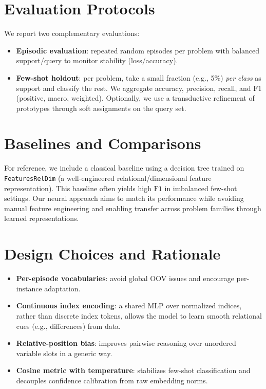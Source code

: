 \documentclass[11pt]{article}
\begin{document}
\section{Evaluation Protocols}
We report two complementary evaluations:
\begin{itemize}[noitemsep]
  \item \textbf{Episodic evaluation}: repeated random episodes per problem with balanced support/query to monitor stability (loss/accuracy).
  \item \textbf{Few-shot holdout}: per problem, take a small fraction (e.g., 5\%) \emph{per class} as support and classify the rest. We aggregate accuracy, precision, recall, and $\mathrm{F1}$ (positive, macro, weighted). Optionally, we use a transductive refinement of prototypes through soft assignments on the query set.
\end{itemize}

\section{Baselines and Comparisons}
For reference, we include a classical baseline using a decision tree trained on \texttt{FeaturesRelDim} (a well-engineered relational/dimensional feature representation). This baseline often yields high $\mathrm{F1}$ in imbalanced few-shot settings. Our neural approach aims to match its performance while avoiding manual feature engineering and enabling transfer across problem families through learned representations.

\section{Design Choices and Rationale}
\begin{itemize}[noitemsep]
  \item \textbf{Per-episode vocabularies}: avoid global OOV issues and encourage per-instance adaptation.
  \item \textbf{Continuous index encoding}: a shared MLP over normalized indices, rather than discrete index tokens, allows the model to learn smooth relational cues (e.g., differences) from data.
  \item \textbf{Relative-position bias}: improves pairwise reasoning over unordered variable slots in a generic way.
  \item \textbf{Cosine metric with temperature}: stabilizes few-shot classification and decouples confidence calibration from raw embedding norms.
\end{itemize}
\end{document}
